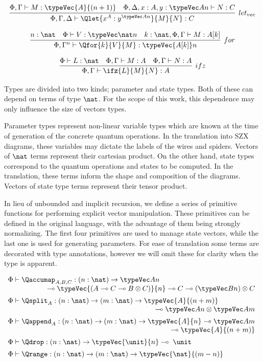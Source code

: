 \begin{table}
    \[
        \infer[let_{vec}]{\Phi,\Gamma,\Delta\vdash \Qlet{x^A : y^{\typeVec A n}}{M}{N}:C}{\Phi,\Gamma\vdash M:\typeVec{A}{(n+1)} & \Phi,\Delta,x:A,y:\typeVec A n\vdash N: C}
    \]
    
    \[
        \infer[for]{\Phi, \Gamma^n \vdash \Qfor{k}{V}{M} : \typeVec {A[k]} n}{n:\nat & \Phi\vdash V:\typeVec \nat n & k:\nat,\Phi,\Gamma \vdash M:A[k]}
    \]
    
    \[
        \infer[ifz]{\Phi, \Gamma \vdash \ifz{L}{M}{N} : A}{\Phi \vdash L:\nat & \Phi,\Gamma\vdash M:A & \Phi,\Gamma\vdash N: A}
    \]
    \caption{Type system.}
    \label{fig:linear-fragment-typing}
\end{table}

Types are divided into two kinds; parameter and state types. Both of these can depend on terms of type $\nat$. For the scope of this work, this dependence may only influence the size of vectors types.

Parameter types represent non-linear variable types which are known at the time of generation of the concrete quantum operations. In the translation into SZX diagrams, these variables may dictate the labels of the wires and spiders. Vectors of $\nat$ terms represent their cartesian product.
%
On the other hand, state types correspond to the quantum operations and states to be computed. In the translation, these terms inform the shape and composition of the diagrams. Vectors of state type terms represent their tensor product.

In lieu of unbounded and implicit recursion, we define a series of primitive functions for performing explicit vector manipulation. These primitives can be defined in the original language, with the advantage of them being strongly normalizing. The first four primitives are used to manage state vectors, while the last one is used for generating parameters. For ease of translation some terms are decorated with type annotations, however we will omit these for clarity when the type is apparent.

\begin{center}
$
\begin{array}{l}
    \Phi\vdash \Qaccumap_{A,B,C} : (n:\nat) \to \typeVec A n \;\\
    \multicolumn{1}{r}{\multimap\typeVec{(A \multimap C \multimap B \otimes C)}{n} \multimap C \multimap (\typeVec B n) \otimes C} \\[5pt]
    \Phi\vdash \Qsplit_A : (n:\nat) \to (m:\nat) \to \typeVec{A}{(n+m)} \\
    \multicolumn{1}{r}{\multimap \typeVec A n \otimes \typeVec A m}\\[5 pt]
    \Phi\vdash \Qappend_A : (n:\nat) \to (m:\nat) \to \typeVec{A}{n} \multimap \typeVec A m \\
    \multicolumn{1}{r}{\qquad\multimap \typeVec{A}{(n+m)}}\\[5pt]
    \Phi\vdash \Qdrop : (n:\nat) \to \typeVec{\unit}{n} \multimap\; \unit \\[5pt]
    \Phi\vdash \Qrange : (n:\nat)\to (m:\nat)\to \typeVec{\nat}{(m-n)} \\
\end{array}
$
\end{center}

